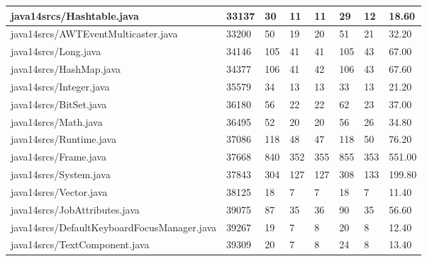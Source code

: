 \begin{tabular}{|l|l|l|l|l|l|l|l|}
\hline
java14srcs/Hashtable.java                          & 33137       & 30        & 11        & 11        & 29        & 12        & 18.60     \\
\hline
java14srcs/AWTEventMulticaster.java                & 33200       & 50        & 19        & 20        & 51        & 21        & 32.20     \\
\hline
java14srcs/Long.java                               & 34146       & 105       & 41        & 41        & 105       & 43        & 67.00     \\
\hline
java14srcs/HashMap.java                            & 34377       & 106       & 41        & 42        & 106       & 43        & 67.60     \\
\hline
java14srcs/Integer.java                            & 35579       & 34        & 13        & 13        & 33        & 13        & 21.20     \\
\hline
java14srcs/BitSet.java                             & 36180       & 56        & 22        & 22        & 62        & 23        & 37.00     \\
\hline
java14srcs/Math.java                               & 36495       & 52        & 20        & 20        & 56        & 26        & 34.80     \\
\hline
java14srcs/Runtime.java                            & 37086       & 118       & 48        & 47        & 118       & 50        & 76.20     \\
\hline
java14srcs/Frame.java                              & 37668       & 840       & 352       & 355       & 855       & 353       & 551.00    \\
\hline
java14srcs/System.java                             & 37843       & 304       & 127       & 127       & 308       & 133       & 199.80    \\
\hline
java14srcs/Vector.java                             & 38125       & 18        & 7         & 7         & 18        & 7         & 11.40     \\
\hline
java14srcs/JobAttributes.java                      & 39075       & 87        & 35        & 36        & 90        & 35        & 56.60     \\
\hline
java14srcs/DefaultKeyboardFocusManager.java        & 39267       & 19        & 7         & 8         & 20        & 8         & 12.40     \\
\hline
java14srcs/TextComponent.java                      & 39309       & 20        & 7         & 8         & 24        & 8         & 13.40     \\

\end{tabular}

